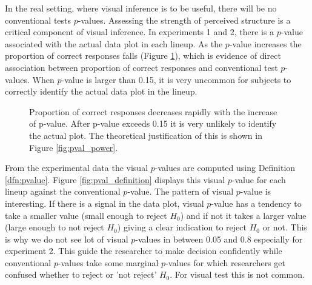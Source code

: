 \documentclass{article}
\begin{document}
In the real setting, where visual inference is to be useful, there will be no conventional tests $p$-values. Assessing the strength of perceived structure is a critical component of visual inference. In experiments 1 and 2, there is a $p$-value associated with the actual data plot in each lineup. As the $p$-value increases the proportion of correct responses falls (Figure \ref{fig:pval_pcorrect}), which is evidence of direct association between proportion of correct responses and conventional test $p$-values. When $p$-value is larger than 0.15, it is very uncommon for subjects to correctly identify the actual data plot in the lineup.

\begin{figure}[hbtp]
   \centering
       \caption{Proportion of correct responses decreases rapidly with the increase of p-value. After p-value exceeds 0.15 it is very unlikely to identify the actual plot. The theoretical justification of this is shown in Figure \ref{fig:pval_power}. }
       \label{fig:pval_pcorrect}
\end{figure}

From the experimental data the visual $p$-values are computed using Definition \ref{dfn:pvalue}. Figure \ref{fig:pval_definition} displays this visual $p$-value for each lineup against the conventional $p$-value.  The pattern of visual $p$-value is interesting. If there is a signal in the data plot, visual $p$-value has a tendency to take a smaller value (small enough to reject $H_0$) and if not it takes a larger value (large enough to not reject $H_0$) giving a clear indication to reject $H_0$ or not. This is why we do not see lot of visual $p$-values in between 0.05 and 0.8 especially for experiment 2. This guide the researcher to make decision confidently while conventional $p$-values take some marginal $p$-values for which researchers get confused whether to reject or 'not reject' $H_0$. For visual test this is not common.  
\end{document}
